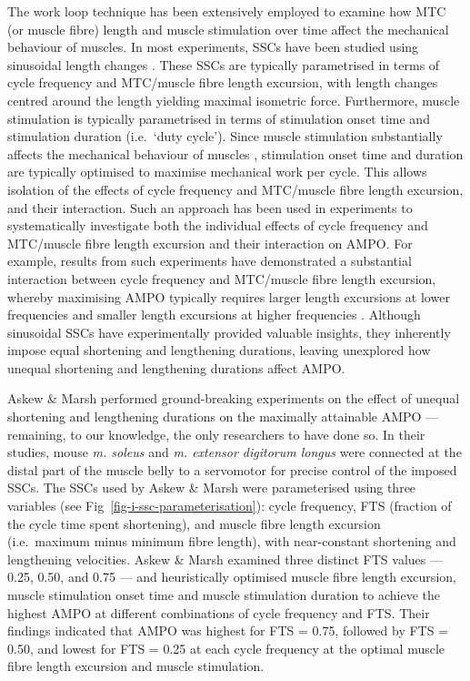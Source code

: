 \documentclass[
  10pt,
  letterpaper,
]{article}
\begin{document}
The work loop technique has been extensively employed to examine how MTC
(or muscle fibre) length and muscle stimulation over time affect the
mechanical behaviour of muscles. In most experiments, SSCs have been
studied using sinusoidal length changes
\citep[e.g.][]{josephson_mechanical_1985}. These SSCs are typically
parametrised in terms of cycle frequency and MTC/muscle fibre length
excursion, with length changes centred around the length yielding
maximal isometric force. Furthermore, muscle stimulation is typically
parametrised in terms of stimulation onset time and stimulation duration
(i.e.~`duty cycle'). Since muscle stimulation substantially affects the
mechanical behaviour of muscles
\citep[e.g.][]{curtin_remarkable_2018, sawicki_timing_2015, stevens_pattern_1996},
stimulation onset time and duration are typically optimised to maximise
mechanical work per cycle. This allows isolation of the effects of cycle
frequency and MTC/muscle fibre length excursion, and their interaction.
Such an approach has been used in experiments to systematically
investigate both the individual effects of cycle frequency and
MTC/muscle fibre length excursion and their interaction on AMPO. For
example, results from such experiments have demonstrated a substantial
interaction between cycle frequency and MTC/muscle fibre length
excursion, whereby maximising AMPO typically requires larger length
excursions at lower frequencies and smaller length excursions at higher
frequencies
\citep[e.g.][]{altringham_modelling_1990, james_mechanical_1995, caiozzo_determinants_1997}.
Although sinusoidal SSCs have experimentally provided valuable insights,
they inherently impose equal shortening and lengthening durations,
leaving unexplored how unequal shortening and lengthening durations
affect AMPO.

Askew \& Marsh {\citep{askew_effects_1997, askew_optimal_1998}}
performed ground-breaking experiments on the effect of unequal
shortening and lengthening durations on the maximally attainable AMPO
--- remaining, to our knowledge, the only researchers to have done so.
In their studies, mouse \emph{m. soleus} and \emph{m. extensor digitorum
longus} were connected at the distal part of the muscle belly to a
servomotor for precise control of the imposed SSCs. The SSCs used by
Askew \& Marsh were parameterised using three variables (see
Fig~\ref{fig-i-ssc-parameterisation}): cycle frequency, FTS (fraction of
the cycle time spent shortening), and muscle fibre length excursion
(i.e.~maximum minus minimum fibre length), with near-constant shortening
and lengthening velocities. Askew \& Marsh
{\citep{askew_effects_1997, askew_optimal_1998}} examined three distinct
FTS values --- 0.25, 0.50, and 0.75 --- and heuristically optimised
muscle fibre length excursion, muscle stimulation onset time and muscle
stimulation duration to achieve the highest AMPO at different
combinations of cycle frequency and FTS. Their findings indicated that
AMPO was highest for FTS = 0.75, followed by FTS = 0.50, and lowest for
FTS = 0.25 at each cycle frequency at the optimal muscle fibre length
excursion and muscle stimulation.
\end{document}
